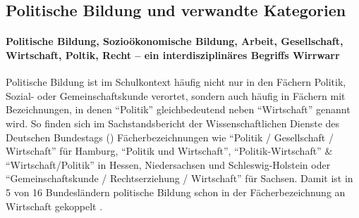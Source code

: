 







\subsection{Politische Bildung und verwandte Kategorien \label{polBildung}}
\paragraph{Politische Bildung, Sozioökonomische Bildung, Arbeit, Gesellschaft, Wirtschaft, Poltik, Recht -- ein interdisziplinäres Begriffs Wirrwarr} 
Politische Bildung %
ist im Schulkontext häufig nicht nur in den Fächern Politik, Sozial- oder Gemeinschaftskunde verortet, sondern auch häufig in Fächern mit Bezeichnungen, in denen \enquote{Politik} gleichbedeutend neben \enquote{Wirtschaft} genannt wird. 
So finden sich im Sachstandsbericht der Wissenschaftlichen Dienste des Deutschen Bundestags (\citeyear[5]{WD8.2016}) Fächerbezeichnungen wie \enquote{Politik / Gesellschaft / Wirtschaft} für Hamburg, \enquote{Politik und Wirtschaft}, \enquote{Politik-Wirtschaft} \& \enquote{Wirtschaft/Politik} in Hessen, Niedersachsen und Schleswig-Holstein oder \enquote{Gemeinschaftskunde / Rechtserziehung / Wirtschaft} für Sachsen. Damit ist in 5 von 16 Bundesländern politische Bildung schon in der Fächerbezeichnung an Wirtschaft gekoppelt \autocite[vgl. zu der tatsächlichen Zeit, die für politische Bildung im Unterricht an allgemeinbildenden Schulen zur Verfügung steht auch][14 \& 16]{Gokbudak2020}.

